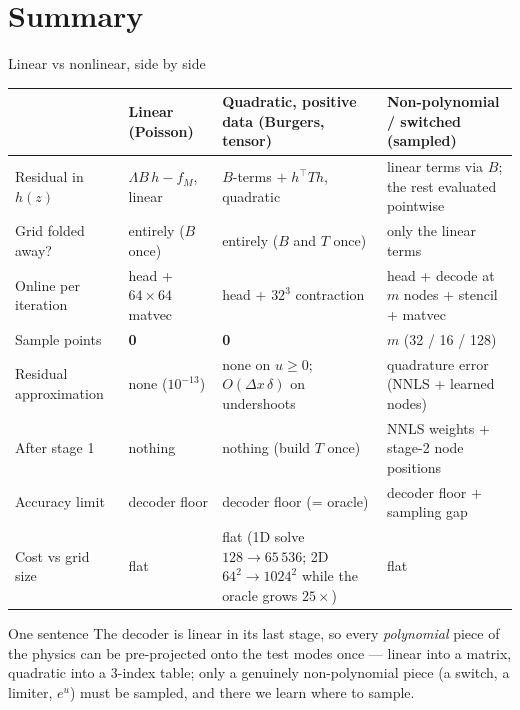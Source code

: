 \documentclass[10pt,aspectratio=169]{beamer}
\newcommand{\T}{^{\top}}
\begin{document}
\section{Summary}
\begin{frame}{Linear vs nonlinear, side by side}
  \centering\scriptsize
  \renewcommand{\arraystretch}{1.15}
  \setlength{\tabcolsep}{3pt}
  \begin{tabular}{@{}p{}p{}p{}p{}@{}}
    \toprule
     & \textbf{Linear (Poisson)} & \textbf{Quadratic, positive data (Burgers, tensor)} & \textbf{Non-polynomial / switched (sampled)}\\
    \midrule
    Residual in $h(z)$ & $\Lambda B\,h-f_M$, linear & $B$-terms $+\;h\T T h$, quadratic & linear terms via $B$; the rest evaluated pointwise\\
    Grid folded away? & entirely ($B$ once) & entirely ($B$ and $T$ once) & only the linear terms\\
    Online per iteration & head + $64\times64$ matvec & head + $32^3$ contraction & head + decode at $m$ nodes + stencil + matvec\\
    Sample points & \textbf{0} & \textbf{0} & $m$ (32 / 16 / 128)\\
    Residual approximation & none ($10^{-13}$) & none on $u\ge0$; $O(\Delta x\,\delta)$ on undershoots & quadrature error (NNLS + learned nodes)\\
    After stage 1 & nothing & nothing (build $T$ once) & NNLS weights + stage-2 node positions\\
    Accuracy limit & decoder floor & decoder floor (= oracle) & decoder floor $+$ sampling gap\\
    Cost vs grid size & flat & flat (1D solve $128\to65\,536$; 2D $64^2\to1024^2$ while the oracle grows $25\times$) & flat\\
    \bottomrule
  \end{tabular}
  \vspace{2mm}
  \begin{block}{One sentence}
    \small The decoder is linear in its last stage, so every \emph{polynomial} piece of the physics can be pre-projected onto the test modes once --- linear into a matrix, quadratic into a 3-index table; only a genuinely non-polynomial piece (a switch, a limiter, $e^u$) must be sampled, and there we learn where to sample.
  \end{block}
\end{frame}
\end{document}

